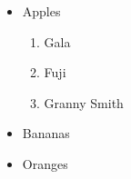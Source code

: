 \documentclass{article}
\begin{document}
	
	\begin{itemize}
		\item Apples
		\begin{enumerate}
			\item Gala
			\item Fuji
			\item Granny Smith
		\end{enumerate}
		\item Bananas
		\item Oranges
	\end{itemize}
	
\end{document}
